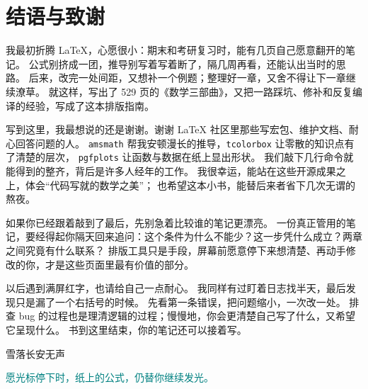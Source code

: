 \documentclass[UTF8,11pt,a4paper,oneside,openany,linespread=1]{ctexbook}
\begin{document}
\chapter*{结语与致谢}
{}

我最初折腾 \LaTeX{}，心愿很小：期末和考研复习时，能有几页自己愿意翻开的笔记。
公式别挤成一团，推导别写着写着断了，隔几周再看，还能认出当时的思路。
后来，改完一处间距，又想补一个例题；整理好一章，又舍不得让下一章继续潦草。
就这样，写出了 529 页的《数学三部曲》，又把一路踩坑、修补和反复编译的经验，写成了这本排版指南。

写到这里，我最想说的还是谢谢。谢谢 \LaTeX{} 社区里那些写宏包、维护文档、耐心回答问题的人。
\texttt{amsmath} 帮我安顿漫长的推导，\texttt{tcolorbox} 让零散的知识点有了清楚的层次，
\texttt{pgfplots} 让函数与数据在纸上显出形状。
我们敲下几行命令就能得到的整齐，背后是许多人经年的工作。
我很幸运，能站在这些开源成果之上，体会“代码写就的数学之美”；
也希望这本小书，能替后来者省下几次无谓的熬夜。

如果你已经跟着敲到了最后，先别急着比较谁的笔记更漂亮。
一份真正管用的笔记，要经得起你隔天回来追问：这个条件为什么不能少？这一步凭什么成立？两章之间究竟有什么联系？
排版工具只是手段，屏幕前愿意停下来想清楚、再动手修改的你，才是这些页面里最有价值的部分。

以后遇到满屏红字，也请给自己一点耐心。
我同样有过盯着日志找半天，最后发现只是漏了一个右括号的时候。
先看第一条错误，把问题缩小，一次改一处。
排查 bug 的过程也是理清逻辑的过程；慢慢地，你会更清楚自己写了什么，又希望它呈现什么。
书到这里结束，你的笔记还可以接着写。

\begin{flushright}
雪落长安无声
\end{flushright}
\medskip
\noindent\textcolor{Teal}{愿光标停下时，纸上的公式，仍替你继续发光。}
\end{document}
